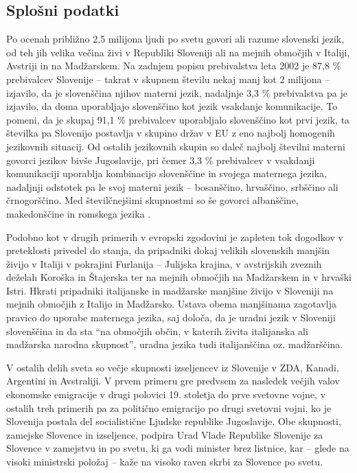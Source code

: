 \begin{multicols}{2}

\subsection{Splošni podatki}

Po ocenah približno 2,5 mili\-jona ljudi po svetu go\-vo\-ri ali razume slovenski jezik, od teh jih velika večina živi v Republiki Sloveniji ali na mejnih območjih v Italiji, Avstriji in na Madžarskem. Na zadnjem popisu prebivalstva leta 2002 je 87,8 \% prebivalcev Slovenije – takrat v skupnem številu nekaj manj kot 2 mili\-jona – izjavilo, da je slovenščina njihov materni jezik, nadaljnje 3,3 \% prebivalstva pa je izjavilo, da doma uporab\-ljajo slovenščino kot jezik vsakdanje komunikacije. To po\-meni, da je skupaj 91,1 \% prebivalcev uporab\-ljalo slovenščino kot prvi jezik, ta številka pa Slovenijo postav\-lja v skupino držav v EU z eno naj\-bolj homogenih jezikovnih situacij. Od ostalih jezikovnih skupin so daleč naj\-bolj številni materni go\-vorci jezikov bivše Jugoslavije, pri čemer 3,3 \% prebivalcev v vsakdanji komunikaciji uporab\-lja kombinacijo slovenščine in svojega maternega jezika, nadaljnji odstotek pa le svoj materni jezik – bosanščino, hrvaščino, srbščino ali črnogorščino. Med številčnejšimi skupnostmi so še go\-vorci albanščine, makedonščine in romskega jezika \cite{SURS1}.

Podobno kot v drugih primerih v evropski zgodovini je zapleten tok dogodkov v preteklosti privedel do stanja, da pripadniki dokaj velikih slovenskih manj\-šin živijo v Italiji v pokrajini Furlanija -- Julijska krajina, v avstrijskih zveznih deželah Koroška in Štajerska ter na mejnih območjih na Madžarskem in v hrvaški Istri. Hkrati pripadniki itali\-janske in mad\-žarske manjšine živijo v Sloveniji na mejnih območjih z Italijo in Madžarsko. Ustava obema manjšinama zagotav\-lja pravico do uporabe maternega jezika, saj določa, da je uradni jezik v Sloveniji slovenščina in da sta “na območjih občin, v katerih živita itali\-janska ali madžarska narodna skupnost”, uradna jezika tudi itali\-janščina oz. madžarščina.

V ostalih delih sveta so večje skupnosti izseljencev iz Slovenije v ZDA, Kanadi, Argentini in Avstra\-liji. V prvem primeru gre predvsem za nasledek večjih valov ekonomske emigracije v drugi polovici 19. stoletja do prve svetovne vojne, v ostalih treh primerih pa za politično emigracijo po drugi svetovni vojni, ko je Slovenija postala del socialistične Ljudske republike Jugoslavije. Obe skupnosti, zamejske Slovence in izseljence, podpira Urad Vlade Republike Slovenije za Slovence v zamejstvu in po svetu, ki ga vodi minister brez listnice, kar – glede na visoki ministrski položaj – kaže na visoko raven skrbi za Slovence po svetu.


\end{multicols}
